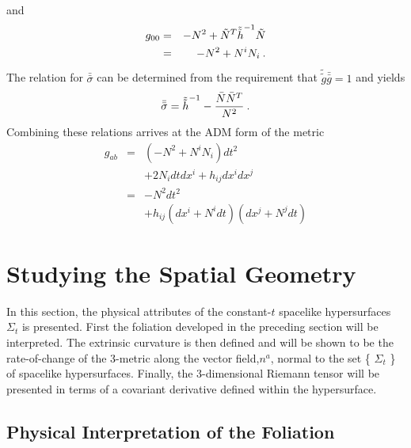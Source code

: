 and
\begin{eqnarray*}
   g_{00} & = &  -N^2 + {\tilde N}^T {\tilde {\tilde h}}^{-1} \tilde N \\
          & = &  -N^2 + N^{i} N_{i} \: .
\end{eqnarray*}
The relation for ${\bar {\bar \sigma}}$ can be determined from the requirement
that ${\tilde {\tilde g}} {\bar {\bar g}} = 1$ and yields
\[
   {\bar {\bar \sigma}} = {\tilde {\tilde h}}^{-1}
                          - \frac{ \bar N {\bar N}^T }{N^2} \: .
\]
Combining these relations arrives at the ADM form of the metric
\begin{eqnarray}\label{eq:g_ADM}
   g_{ab} & = & \left( -N^2 + N^i N_i \right) dt^2 \nonumber \\
          &   &  + 2 N_i dt dx^i + h_{ij} dx^i dx^j \nonumber \\
          & = & -N^2 dt^2 \nonumber \\
          &   & + h_{ij}\left(dx^i + N^i dt\right) \left(dx^j + N^j dt\right)
\end{eqnarray}

\section{Studying the Spatial Geometry}\label{S:spatial_geo}

In this section, the physical attributes of the constant-$t$ spacelike
hypersurfaces $\Sigma_t$ is presented.  First the foliation developed in the
preceding section will be interpreted.  The extrinsic curvature is then
defined and will be shown to be the rate-of-change of the 3-metric along
the vector field,$n^a$, normal to the set \{ $\Sigma_t$ \} of spacelike hypersurfaces.
Finally, the 3-dimensional Riemann tensor will be presented in terms of a
covariant derivative defined within the hypersurface.



\subsection{Physical Interpretation of the Foliation}

